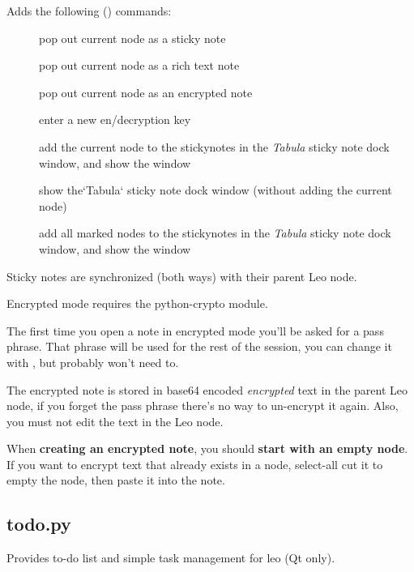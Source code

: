 \documentclass[a4paper,10pt,english]{sphinxmanual}
\begin{document}
Adds the following () commands:
\begin{description}
\item[{}] \leavevmode
pop out current node as a sticky note

\item[{}] \leavevmode
pop out current node as a rich text note

\item[{}] \leavevmode
pop out current node as an encrypted note

\item[{}] \leavevmode
enter a new en/decryption key

\item[{}] \leavevmode
add the current node to the stickynotes in the \emph{Tabula}
sticky note dock window, and show the window

\item[{}] \leavevmode
show the{}`Tabula{}` sticky note dock window
(without adding the current node)

\item[{}] \leavevmode
add all marked nodes to the stickynotes in the \emph{Tabula}
sticky note dock window, and show the window

\end{description}

Sticky notes are synchronized (both ways) with their parent Leo node.

Encrypted mode requires the python-crypto module.

The first time you open a note in encrypted mode you'll be asked for a pass
phrase. That phrase will be used for the rest of the session, you can change it
with  , but probably won't need to.

The encrypted note is stored in base64 encoded \emph{encrypted} text in the parent
Leo node, if you forget the pass phrase there's no way to un-encrypt it again.
Also, you must not edit the text in the Leo node.

When \textbf{creating an encrypted note}, you should \textbf{start with an empty node}.
If you want to encrypt text that already exists in a node, select-all cut it to
empty the node, then paste it into the note.


\subsection{todo.py}
\label{plugins:todo-py}
Provides to-do list and simple task management for leo (Qt only).
\end{document}
